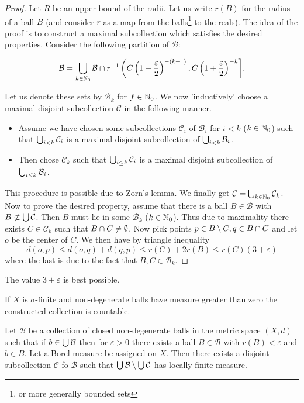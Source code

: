 \documentclass[a4paper,11pt]{article}
\begin{document}
\begin{proof}
Let $R$ be an upper bound of the radii. Let us write $r(B)$ for the radius of a ball $B$ (and consider $r$ as a map from the balls\footnote{or more generally bounded sets} to the reals).
The idea of the proof is to construct a maximal subcollection which satisfies the desired properties. Consider the following partition of $\mathcal{B}$:

\begin{equation}
\mathcal{B} = \bigcup_{k\in\mathbb{N}_0}{\mathcal{B}\cap{r^{-1}\left(C\left(1+\frac{\varepsilon}{2}\right)^{-(k+1)},C\left(1+\frac{\varepsilon}{2}\right)^{-k}\right]}}\text{.}
\end{equation}

Let us denote these sets by $\mathcal{B}_k$ for $f\in\mathbb{N}_0$. We now 'inductively' choose a maximal disjoint subcollection $\mathcal{C}$ in the following manner.
\begin{itemize}
\item Assume we have chosen some subcollections $\mathcal{C}_i$ of $\mathcal{B}_i$ for $i<k$ ($k\in\mathbb{N}_0$) such that $\bigcup_{i<k}{\mathcal{C}_i}$ is a maximal disjoint subcollection of $\bigcup_{i<k}{\mathcal{B}_i}$.
\item Then chose $\mathcal{C}_k$ such that $\bigcup_{i\leq k}{\mathcal{C}_i}$ is a maximal disjoint subcollection of $\bigcup_{i\leq k}{\mathcal{B}_i}$.
\end{itemize}
This procedure is possible due to Zorn's lemma.
We finally get $\mathcal{C}=\bigcup_{k\in\mathbb{N}_0}{\mathcal{C}_k}$. Now to prove the desired property, assume that there is a ball $B\in\mathcal{B}$ with $B\not\subset\bigcup\mathcal{C}$. Then $B$ must lie in some $\mathcal{B}_k$ 
($k\in\mathbb{N}_0$). Thus due to maximality there exists $C\in\mathcal{C}_k$ such that $B\cap C\neq \emptyset$. 
Now pick points $p\in B\setminus C, q\in B\cap C$ and let $o$ be the center of $C$. We then have by triangle inequality 
\begin{equation}
d(o,p)\leq d(o,q)+d(q,p)\leq r(C)+2r(B)\leq r(C)(3+\varepsilon)
\end{equation}
where the last is due to the fact that $B,C\in\mathcal{B}_k$.
\end{proof}

\begin{remark}
The value $3+\varepsilon$ is best possible.
\end{remark}

\begin{remark}
If $X$ is $\sigma$-finite and non-degenerate balls have measure greater than zero the constructed collection is countable.
\end{remark}

\begin{theorem}
Let $\mathcal{B}$ be a collection of closed non-degenerate balls in the metric space $(X,d)$ such that if $b\in\bigcup\mathcal{B}$ then for $\varepsilon>0$ there exists a ball $B\in\mathcal{B}$ with $r(B)<\varepsilon$ and $b\in B$. Let a Borel-measure be assigned on $X$. Then there exists a disjoint subcollection $\mathcal{C}$ fo $\mathcal{B}$ such that $\bigcup\mathcal{B}\setminus\bigcup\mathcal{C}$ has locally finite measure.
\end{theorem}
\end{document}
